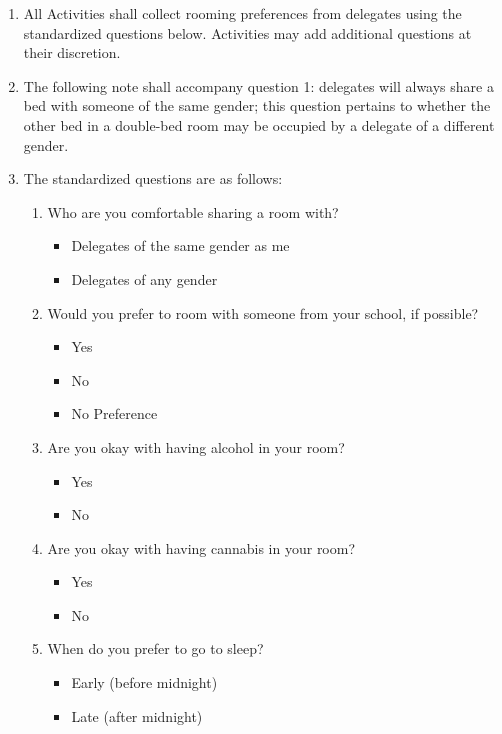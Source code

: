 \begin{enumerate}
 \item
  All Activities shall collect rooming preferences from delegates using the standardized questions below. Activities may add additional questions at their discretion.
 \item
  The following note shall accompany question 1: delegates will always share a bed with someone of the same gender; this question pertains to whether the other bed in a double-bed room may be occupied by a delegate of a different gender.
 \item
  The standardized questions are as follows:

  \begin{enumerate}
   \item
    Who are you comfortable sharing a room with?
    \begin{itemize}
     \item Delegates of the same gender as me
     \item Delegates of any gender
    \end{itemize}

   \item
    Would you prefer to room with someone from your school, if possible?
    \begin{itemize}
     \item Yes
     \item No
     \item No Preference
    \end{itemize}

   \item
    Are you okay with having alcohol in your room?
    \begin{itemize}
     \item Yes
     \item No
    \end{itemize}

   \item
    Are you okay with having cannabis in your room?
    \begin{itemize}
     \item Yes
     \item No
    \end{itemize}

   \item
    When do you prefer to go to sleep?
    \begin{itemize}
     \item Early (before midnight)
     \item Late (after midnight)
    \end{itemize}


\end{enumerate}
\end{enumerate}
